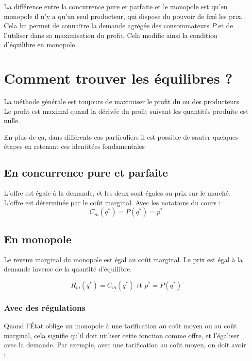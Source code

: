 \documentclass[
  a4paper,
]{book}
\theoremstyle{definition}
\theoremstyle{definition}
\theoremstyle{definition}
\theoremstyle{definition}
\theoremstyle{remark}
\begin{document}
La différence entre la concurrence pure et parfaite et le monopole est qu'en monopole il n'y a qu'un seul producteur, qui dispose du pouvoir de fixé les prix.
Cela lui permet de connaître la demande agrégée des consommateurs \(P\) et de l'utiliser dans sa maximisation du profit.
Cela modifie ainsi la condition d'équilibre en monopole.

\hypertarget{comment-trouver-les-uxe9quilibres}{%
\chapter{Comment trouver les équilibres ?}\label{comment-trouver-les-uxe9quilibres}}

La méthode générale est toujours de maximiser le profit du ou des producteurs.
Le profit est maximal quand la dérivée du profit suivant les quantités produite est nulle.

En plus de ça, dans différents cas particuliers il est possible de sauter quelques étapes en retenant ces identitées fondamentales

\hypertarget{en-concurrence-pure-et-parfaite}{%
\section{En concurrence pure et parfaite}\label{en-concurrence-pure-et-parfaite}}

L'offre est égale à la demande, et les deux sont égales au prix sur le marché.
L'offre est déterminée par le coût marginal.
Avec les notations du cours :
\[C_m(q^*)=P(q^*)=p^*\]

\hypertarget{en-monopole}{%
\section{En monopole}\label{en-monopole}}

Le revenu marginal du monopole est égal au coût marginal.
Le prix est égal à la demande inverse de la quantité d'équilibre.

\[R_m(q^*)=C_m(q^*)\text{ et }p^*=P(q^*)\]

\hypertarget{avec-des-ruxe9gulations}{%
\subsection{Avec des régulations}\label{avec-des-ruxe9gulations}}

Quand l'État oblige un monopole à une tarification au coût moyen ou au coût marginal, cela signifie qu'il doit utiliser cette fonction comme offre, et l'égaliser avec la demande.
Par exemple, avec une tarification au coût moyen, on doit avoir :
\end{document}
